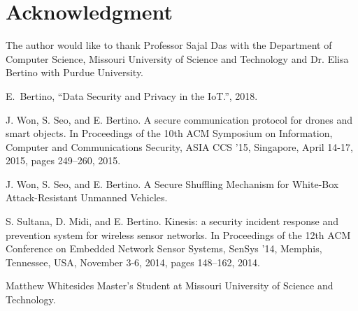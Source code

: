 \documentclass[journal,onecolumn]{IEEEtran}
\begin{document}
\section*{Acknowledgment}
The author would like to thank Professor Sajal Das with the Department of Computer Science, Missouri University of Science and Technology and Dr. Elisa Bertino with Purdue University.

\ifCLASSOPTIONcaptionsoff
  \newpage
\fi

\begin{thebibliography}{1}

E.~Bertino, ``Data Security and Privacy in the IoT.'', 2018. 

J. Won, S. Seo, and E. Bertino. A secure communication protocol for drones and smart objects. In Proceedings of the 10th ACM Symposium on Information, Computer and Communications Security, ASIA CCS ’15, Singapore, April 14-17, 2015, pages 249–260, 2015.

J. Won, S. Seo, and E. Bertino. A Secure Shuffling Mechanism for White-Box Attack-Resistant Unmanned Vehicles.

S. Sultana, D. Midi, and E. Bertino. Kinesis: a security incident response and prevention system for wireless sensor networks. In Proceedings of the 12th ACM Conference on Embedded Network Sensor Systems, SenSys ’14, Memphis, Tennessee, USA, November 3-6, 2014, pages 148–162, 2014.


\end{thebibliography}

\begin{IEEEbiographynophoto}{Matthew Whitesides}
  Master's Student at Missouri University of Science and Technology.
\end{IEEEbiographynophoto}

\end{document}
